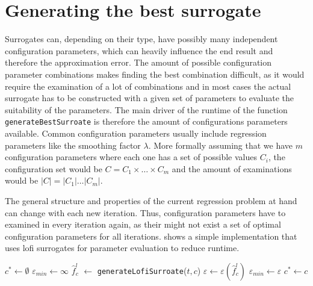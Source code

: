 \documentclass[
  a4paper,  %
  twoside,  %
  bibliography=totoc,
  headsepline,
  cleardoublepage=empty,
  parskip=half,
  draft=false
]{scrbook}
\begin{document}
\section{Generating the best surrogate}

Surrogates can, depending on their type, have possibly many independent configuration parameters, which can heavily influence the end result and therefore the approximation error.
The amount of possible configuration parameter combinations makes finding the best combination difficult, as it would require the examination of a lot of combinations and in most cases the actual surrogate has to be constructed with a given set of parameters to evaluate the suitability of the parameters.
The main driver of the runtime of the function \texttt{generateBestSurroate} is therefore the amount of configurations parameters available.
Common configuration parameters usually include regression parameters like the smoothing factor $\lambda$.
More formally assuming that we have $m$ configuration parameters where each one has a set of possible values $C_i$, the configuration set would be $C=C_1 \times \dots \times C_m$ and the amount of examinations would be $|C|=|C_1| \dots |C_m|$.

The general structure and properties of the current regression problem at hand can change with each new iteration.
Thus, configuration parameters have to examined in every iteration again, as their might not exist a set of optimal configuration parameters for all iterations.
 shows a simple implementation that uses lofi surrogates for parameter evaluation to reduce runtime.

\newpage
\begin{mdframed}[style=algstyle,frametitle={\textbf{function} \texttt{generateBestSurroate}{$(C, t)$}}]
\normalsize
\vspace{5.5mm}
\begin{algorithmic}[1]
    \State $c^\ast \gets \emptyset$
    \State $\varepsilon_{min} \gets \infty$
      \State $\hat{f}_c^l$ $\gets$ \texttt{generateLofiSurroate}($t, c$)
    	\State $\varepsilon \gets \varepsilon(\hat{f}_c^l)$
    	  \State $\varepsilon_{min}\gets \varepsilon$
    	\State $c^\ast \gets c$
    	\EndIf
    \EndFor
    \State {}
\end{algorithmic}
\vspace{-1.5mm}
\delimit
	\label{alg:bestsur}
\end{mdframed}
\end{document}
